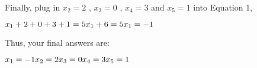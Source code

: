 \documentclass{article}
\begin{document}
\raggedright Finally, plug in \begin{math} x_2 = 2 \end{math} , \begin{math} x_3 = 0 \end{math} , \begin{math} x_4 = 3 \end{math} and \begin{math} x_5 = 1 \end{math} into Equation 1, \newline
    
    \begin{math}
        x_1 + 2 + 0 + 3 + 1 = 5 \newline
        x_1 + 6 = 5 \newline
        x_1 = -1 \newline 
    \end{math}

\raggedright Thus, your final answers are: \newline

    \begin{math}
        x_1 = -1 \newline
        x_2 = 2 \newline
        x_3 = 0 \newline
        x_4 = 3 \newline
        x_5 = 1 \newline
    \end{math}
\end{document}
